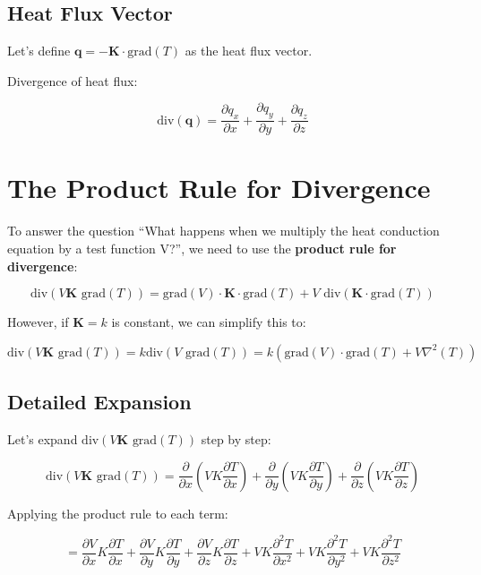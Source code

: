 \documentclass[
  11pt,
  a4paper,
]{scrbook}
\begin{document}
\subsection{Heat Flux Vector}\label{heat-flux-vector}

Let's define \(\mathbf{q} = -\mathbf{K} \cdot \text{grad}(T)\) as the
heat flux vector.

Divergence of heat flux:

\[
\text{div}(\mathbf{q}) = \frac{\partial q_x}{\partial x} + \frac{\partial q_y}{\partial y} + \frac{\partial q_z}{\partial z}
\]

\section{The Product Rule for
Divergence}\label{the-product-rule-for-divergence}

To answer the question ``What happens when we multiply the heat
conduction equation by a test function V?'', we need to use the
\textbf{product rule for divergence}:

\[
\text{div}(V \mathbf{K} \text{ grad}(T)) = \text{grad}(V) \cdot \mathbf{K} \cdot \text{grad}(T) + V \text{ div}(\mathbf{K} \cdot \text{grad}(T))
\]

However, if \(\mathbf{K}=k\) is constant, we can simplify this to:

\[
\text{div}(V \mathbf{K} \text{ grad}(T))=k\text{div}(V \text{ grad}(T))=k(\text{grad}(V) \cdot \text{grad}(T) + V \nabla^2(T))
\]

\subsection{Detailed Expansion}\label{detailed-expansion}

Let's expand \(\text{div}(V \mathbf{K} \text{ grad}(T))\) step by step:

\[\text{div}(V \mathbf{K} \text{ grad}(T)) = \frac{\partial}{\partial x}\left(V K \frac{\partial T}{\partial x}\right) + \frac{\partial}{\partial y}\left(V K \frac{\partial T}{\partial y}\right) + \frac{\partial}{\partial z}\left(V K \frac{\partial T}{\partial z}\right)\]

Applying the product rule to each term:

\[
= \frac{\partial V}{\partial x} K \frac{\partial T}{\partial x} + \frac{\partial V}{\partial y} K \frac{\partial T}{\partial y} + \frac{\partial V}{\partial z} K \frac{\partial T}{\partial z} + V K \frac{\partial^2 T}{\partial x^2} + V K \frac{\partial^2 T}{\partial y^2} + V K \frac{\partial^2 T}{\partial z^2}
\]
\end{document}
